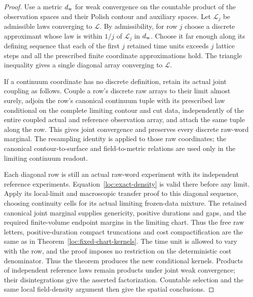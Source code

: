 \begin{proof}
Use a metric $d_{\rm w}$ for weak convergence on the countable product
of the observation spaces and their Polish contour and auxiliary spaces.
Let $\mathcal L_j$ be
admissible laws converging to $\mathcal L$.  By admissibility, for row
$j$ choose a discrete approximant whose law is within $1/j$ of
$\mathcal L_j$ in $d_{\rm w}$.  Choose it
far enough along its defining sequence that each of the first $j$
retained time units exceeds $j$ lattice steps and all the prescribed
finite coordinate approximations hold.  The triangle inequality gives
a single diagonal array converging to $\mathcal L$.

If a continuum coordinate has no discrete definition, retain its actual
joint coupling as follows.  Couple a row's discrete raw arrays to their
limit almost surely, adjoin the row's canonical continuum tuple with
its prescribed law conditional on the complete limiting contour and
cut data, independently of the entire coupled actual and reference
observation array, and attach the same tuple along the row.  This gives
joint convergence and preserves
every discrete raw-word marginal.  The resampling identity is applied
to those raw coordinates; the canonical contour-to-surface and
field-to-metric relations are used only in the limiting continuum
readout.

Each diagonal row is still an actual raw-word experiment with its
independent reference experiments.  Equation~\eqref{loc:exact-density}
is valid there before any limit.  Apply its local-limit and macroscopic
transfer proof to this diagonal sequence, choosing continuity cells for
its actual limiting frozen-data mixture.  The retained canonical joint
marginal supplies genericity, positive durations and gaps, and the
required finite-volume endpoint margins in the limiting chart.  Thus
the free raw letters,
positive-duration compact truncations and cost compactification are the
same as in Theorem~\ref{loc:fixed-chart-kernels}.  The time unit is
allowed to vary with the row, and the proof imposes no restriction on
the deterministic cost denominator.  Thus the theorem produces the
new conditional kernels.  Products of independent reference laws
remain products under joint weak convergence; their disintegrations
give the asserted factorization.  Countable selection and the same
local field-density argument then give the spatial conclusions.


\end{proof}
